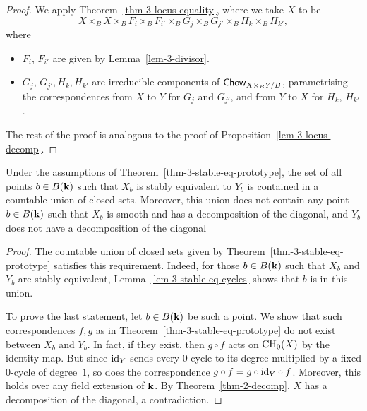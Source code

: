 \begin{proof}
    We apply Theorem~\ref{thm-3-locus-equality}, 
    where we take $X$ to be
    \[ X \times_B X \times_B F_i \times_B F_{i'} \times_B G_j \times_B G_{j'} \times_B H_k \times_B H_{k'}, \]
    where 
    \begin{itemize}
        \item 
            $F_i$, $F_{i'}$ are given by Lemma~\ref{lem-3-divisor}.
        \item 
            $G_j$, $G_{j'}, H_k, H_{k'}$ are irreducible components of $\textsf{\textup{Chow}}_{X \times_B Y / B}$,
            parametrising the correspondences from $X$ to $Y$ for $G_j$ and $G_{j'}$,
            and from $Y$ to $X$ for $H_k$, $H_{k'}$.
    \end{itemize}
    The rest of the proof is analogous to the proof of Proposition~\ref{lem-3-locus-decomp}.
\end{proof}

\begin{corollary} \label{cor-3-stable-eq-prototype}
    Under the assumptions of Theorem~\ref{thm-3-stable-eq-prototype},
    the set of all points $b \in B(\bbk)$ such that $X_b$ is stably equivalent to $Y_b$
    is contained in a countable union of closed sets.
    Moreover, this union does not contain any point $b \in B(\bbk)$
    such that $X_b$ is smooth and has a decomposition of the diagonal,
    and $Y_b$ does not have a decomposition of the diagonal
\end{corollary}

\begin{proof}
    The countable union of closed sets given by Theorem~\ref{thm-3-stable-eq-prototype}
    satisfies this requirement.
    Indeed, for those $b \in B(\bbk)$ such that $X_b$ and $Y_b$ are stably equivalent,
    Lemma~\ref{lem-3-stable-eq-cycles} shows that $b$ is in this union.

    To prove the last statement, let $b \in B(\bbk)$ be such a point.
    We show that such correspondences $f,g$ as in Theorem~\ref{thm-3-stable-eq-prototype} do not exist between $X_b$ and $Y_b$.
    In fact, if they exist, then $g \circ f$ acts on $\mathrm{CH}_0(X)$ by the identity map.
    But since $\mathrm{id}_Y$ sends every $0$-cycle to its degree multiplied by a fixed $0$-cycle of degree~$1$,
    so does the correspondence $g \circ f = g \circ \mathrm{id}_Y \circ f$.
    Moreover, this holds over any field extension of $\bbk$. 
    By Theorem~\ref{thm-2-decomp}, $X$ has a decomposition of the diagonal,
    a contradiction.
\end{proof}

